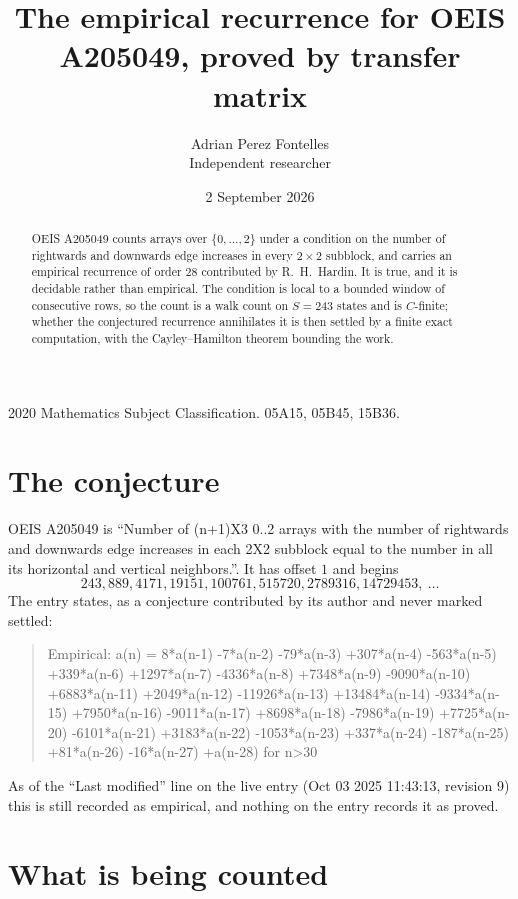 \documentclass[11pt,a4paper]{article}
\title{The empirical recurrence for OEIS A205049, proved by transfer matrix}
\author{Adrian Perez Fontelles\\ \small Independent researcher}
\date{2 September 2026}
\theoremstyle{plain}
\theoremstyle{definition}
\begin{document}
\maketitle

\begin{abstract}
OEIS A205049 counts arrays over $\{0,\dots,2\}$ under a condition on the number of rightwards and downwards edge increases
in every $2\times2$ subblock, and carries an empirical recurrence of order $28$ contributed by
R.~H.~Hardin. It is true, and it is decidable rather than empirical. The condition is local to
a bounded window of consecutive rows, so the count is a walk count on $S=243$ states and is
$C$-finite; whether the conjectured recurrence annihilates it is then settled by a finite exact
computation, with the Cayley--Hamilton theorem bounding the work.
\end{abstract}

\noindent\small 2020 Mathematics Subject Classification. 05A15, 05B45, 15B36.\normalsize

\section{The conjecture}

OEIS A205049 is ``Number of (n+1)X3 0..2 arrays with the number of rightwards and downwards edge increases in each 2X2 subblock equal to the number in all its horizontal and vertical neighbors.''. It has offset $1$ and begins
\[
243, 889, 4171, 19151, 100761, 515720, 2789316, 14729453,\ \dots
\]
The entry states, as a conjecture contributed by its author and never marked settled:
\begin{quote}
Empirical: a(n) = 8*a(n-1) -7*a(n-2) -79*a(n-3) +307*a(n-4) -563*a(n-5) +339*a(n-6) +1297*a(n-7) -4336*a(n-8) +7348*a(n-9) -9090*a(n-10) +6883*a(n-11) +2049*a(n-12) -11926*a(n-13) +13484*a(n-14) -9334*a(n-15) +7950*a(n-16) -9011*a(n-17) +8698*a(n-18) -7986*a(n-19) +7725*a(n-20) -6101*a(n-21) +3183*a(n-22) -1053*a(n-23) +337*a(n-24) -187*a(n-25) +81*a(n-26) -16*a(n-27) +a(n-28) for n>30
\end{quote}
As of the ``Last modified'' line on the live entry (Oct 03 2025 11:43:13, revision 9) this is still
recorded as empirical, and nothing on the entry records it as proved.

\section{What is being counted}
\end{document}
